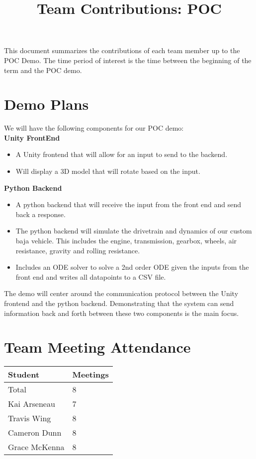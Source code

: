 \documentclass{article}
\title{Team Contributions: POC\\\progname}
\author{\authname}
\date{}
\begin{document}
\maketitle

This document summarizes the contributions of each team member up to the POC
Demo.  The time period of interest is the time between the beginning of the term
and the POC demo.

\section{Demo Plans}

We will have the following components for our POC demo:\\

\noindent
\textbf{Unity FrontEnd}
\begin{itemize}
  \item A Unity frontend that will allow for an input to send to the backend.
  \item Will display a 3D model that will rotate based on the input.
\end{itemize}
\noindent
\textbf{Python Backend}
\begin{itemize}
  \item A python backend that will receive the input from the front end and send back a response.
  \item The python backend will simulate the drivetrain and dynamics of our custom baja vehicle. This includes the engine, transmission, gearbox, wheels, air resistance, gravity and rolling resistance.
  \item Includes an ODE solver to solve a 2nd order ODE given the inputs from the front end and writes all datapoints to a CSV file.
\end{itemize}
\noindent
The demo will center around the communication protocol between the Unity frontend and the python backend.
Demonstrating that the system can send information back and forth between these two components is the main focus.

\section{Team Meeting Attendance}

\begin{table}[H]
\centering
\begin{tabular}{ll}
\toprule
\textbf{Student} & \textbf{Meetings}\\
\midrule
Total & 8\\
Kai Arseneau & 7\\
Travis Wing & 8\\
Cameron Dunn & 8\\
Grace McKenna & 8\\
\bottomrule
\end{tabular}
\end{table}
\end{document}
